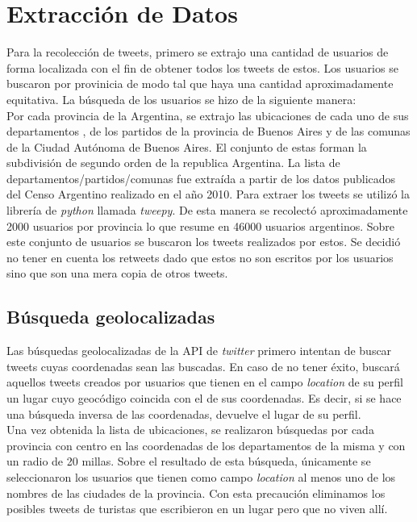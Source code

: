 

\section{Extracción de Datos}

Para la recolección de tweets, primero se extrajo una cantidad de usuarios de forma localizada con el fin de obtener todos los tweets de estos.
Los usuarios se buscaron por provinicia de modo tal que haya una cantidad aproximadamente equitativa.
La búsqueda de los usuarios se hizo de la siguiente manera:\\
Por cada provincia de la Argentina, se extrajo las ubicaciones de cada uno de sus departamentos , de los partidos de la provincia de Buenos Aires y de las comunas de la Ciudad Autónoma de Buenos Aires. El conjunto de estas forman la subdivisión de segundo orden de la republica Argentina. La lista de departamentos/partidos/comunas fue extraída a partir de los datos publicados del Censo Argentino realizado en el año 2010. Para extraer los tweets se utilizó la librería de \textit{python} llamada \textit{tweepy}.
De esta manera se recolectó aproximadamente 2000 usuarios por provincia lo que resume en 46000 usuarios argentinos. Sobre este conjunto de usuarios se buscaron los tweets realizados por estos. Se decidió no tener en cuenta los retweets dado que estos no son escritos por los usuarios sino que son una mera copia de otros tweets. 


\subsection{Búsqueda geolocalizadas}

Las búsquedas geolocalizadas de la API de \textit{twitter} primero intentan de buscar tweets cuyas coordenadas sean las buscadas. En caso de no tener éxito, buscará aquellos tweets creados por usuarios que tienen en el campo \textit{location} de su perfil un lugar cuyo geocódigo coincida con el de sus coordenadas. Es decir, si se hace una búsqueda inversa de las coordenadas, devuelve el lugar de su perfil.\\

Una vez obtenida la lista de ubicaciones, se realizaron búsquedas por cada provincia con centro en las coordenadas de los departamentos de la misma y con un radio de 20 millas. Sobre el resultado de esta búsqueda, únicamente se seleccionaron los usuarios que tienen como campo \textit{location} al menos uno de los nombres de las ciudades de la provincia. Con esta precaución eliminamos los posibles tweets de turistas que escribieron en un lugar pero que no viven allí.

